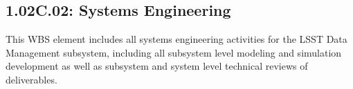 \subsection*{1.02C.02: Systems Engineering}

This WBS element includes all systems engineering activities for the LSST Data
Management subsystem, including all subsystem level modeling and simulation
development as well as subsystem and system level technical reviews of
deliverables.
